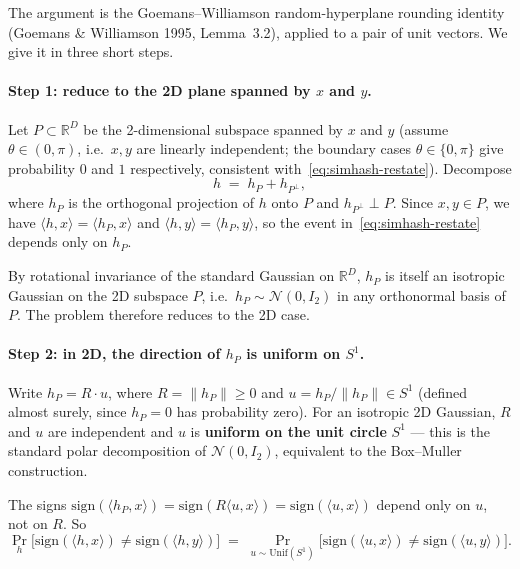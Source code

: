 \documentclass[11pt,a4paper]{article}
\begin{document}
The argument is the Goemans--Williamson random-hyperplane rounding identity (Goemans \& Williamson 1995, Lemma~3.2), applied to a pair of unit vectors. We give it in three short steps.

\paragraph{Step 1: reduce to the 2D plane spanned by $x$ and $y$.} Let $P \subset \mathbb{R}^D$ be the 2-dimensional subspace spanned by $x$ and $y$ (assume $\theta \in (0, \pi)$, i.e.\ $x, y$ are linearly independent; the boundary cases $\theta \in \{0, \pi\}$ give probability $0$ and $1$ respectively, consistent with~\eqref{eq:simhash-restate}). Decompose
\[
h \;=\; h_P + h_{P^\perp},
\]
where $h_P$ is the orthogonal projection of $h$ onto $P$ and $h_{P^\perp} \perp P$. Since $x, y \in P$, we have $\langle h, x\rangle = \langle h_P, x\rangle$ and $\langle h, y\rangle = \langle h_P, y\rangle$, so the event in~\eqref{eq:simhash-restate} depends only on $h_P$.

By rotational invariance of the standard Gaussian on $\mathbb{R}^D$, $h_P$ is itself an isotropic Gaussian on the 2D subspace $P$, i.e.\ $h_P \sim \mathcal{N}(0, I_2)$ in any orthonormal basis of $P$. The problem therefore reduces to the 2D case.

\paragraph{Step 2: in 2D, the direction of $h_P$ is uniform on $S^1$.} Write $h_P = R \cdot u$, where $R = \|h_P\| \geq 0$ and $u = h_P / \|h_P\| \in S^1$ (defined almost surely, since $h_P = 0$ has probability zero). For an isotropic 2D Gaussian, $R$ and $u$ are independent and $u$ is \textbf{uniform on the unit circle} $S^1$ --- this is the standard polar decomposition of $\mathcal{N}(0, I_2)$, equivalent to the Box--Muller construction.

The signs $\mathrm{sign}(\langle h_P, x\rangle) = \mathrm{sign}(R \langle u, x\rangle) = \mathrm{sign}(\langle u, x\rangle)$ depend only on $u$, not on $R$. So
\[
\Pr_h\bigl[\mathrm{sign}(\langle h, x\rangle) \neq \mathrm{sign}(\langle h, y\rangle)\bigr]
\;=\;
\Pr_{u \sim \mathrm{Unif}(S^1)}\bigl[\mathrm{sign}(\langle u, x\rangle) \neq \mathrm{sign}(\langle u, y\rangle)\bigr].
\]
\end{document}
